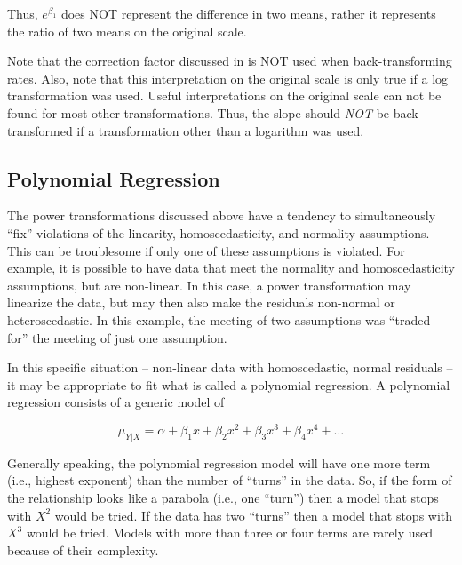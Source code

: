 \documentclass[10pt,openany]{book}\usepackage[]{graphicx}\usepackage[]{color}
\begin{document}
Thus, $e^{\beta_{1}}$ does NOT represent the difference in two means, rather it represents the ratio of two means on the original scale.


Note that the correction factor discussed in  is NOT used when back-transforming rates.  Also, note that this interpretation on the original scale is only true if a log transformation was used.  Useful interpretations on the original scale can not be found for most other transformations.  Thus, the slope should \emph{NOT} be back-transformed if a transformation other than a logarithm was used.


\subsection{Polynomial Regression}
The power transformations discussed above have a tendency to simultaneously ``fix'' violations of the linearity, homoscedasticity, and normality assumptions.  This can be troublesome if only one of these assumptions is violated.  For example, it is possible to have data that meet the normality and homoscedasticity assumptions, but are non-linear.  In this case, a power transformation may linearize the data, but may then also make the residuals non-normal or heteroscedastic.  In this example, the meeting of two assumptions was ``traded for'' the meeting of just one assumption.

In this specific situation -- non-linear data with homoscedastic, normal residuals --  it may be appropriate to fit what is called a polynomial regression.  A polynomial regression consists of a generic model of

\[ \mu_{Y|X}=\alpha+\beta_{1}x +\beta_{2}x^{2}+\beta_{3}x^{3}+\beta_{4}x^{4}+\ldots \]

Generally speaking, the polynomial regression model will have one more term (i.e., highest exponent) than the number of ``turns'' in the data.  So, if the form of the relationship looks like a parabola (i.e., one ``turn'') then a model that stops with $X^{2}$ would be tried.  If the data has two ``turns'' then a model that stops with $X^{3}$ would be tried.  Models with more than three or four terms are rarely used because of their complexity.
\end{document}

